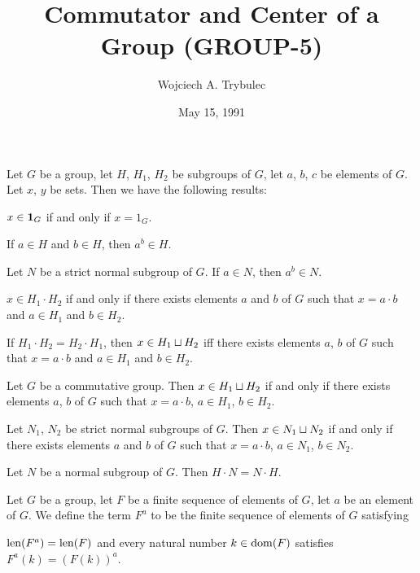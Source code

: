 \documentclass{article}
\title{Commutator and Center of a Group (GROUP-5)}
\author{Wojciech A. Trybulec}
\date{May 15, 1991}
\begin{document}
\maketitle

Let $G$ be a group, let $H$, $H_{1}$, $H_{2}$ be subgroups of $G$, let
$a$, $b$, $c$ be elements of $G$. Let $x$, $y$ be sets. Then we have the
following results:
\begin{thm}
\item\label{group5:1} $x\in\mathbf{1}_{G}$ if and only if $x=1_{G}$.
\item\label{group5:2} If $a\in H$ and $b\in H$, then $a^{b}\in H$.
\item\label{group5:3} Let $N$ be a strict normal subgroup of $G$.
  If $a\in N$, then $a^{b}\in N$.
\item\label{group5:4} $x\in H_{1}\cdot H_{2}$ if and only if there
  exists elements $a$ and $b$ of $G$ such that $x=a\cdot b$ and $a\in H_{1}$ and $b\in H_{2}$.
\item\label{group5:5} If $H_{1}\cdot H_{2}=H_{2}\cdot H_{1}$, then
  $x\in H_{1}\sqcup H_{2}$ iff there exists elements $a$, $b$ of $G$ such
  that $x=a\cdot b$ and $a\in H_{1}$ and $b\in H_{2}$.
\item\label{group5:6} Let $G$ be a commutative group.
  Then $x\in H_{1}\sqcup H_{2}$ if and only if there exists elements $a$,
  $b$ of $G$ such that $x=a\cdot b$, $a\in H_{1}$, $b\in H_{2}$.
\item\label{group5:7} Let $N_{1}$, $N_{2}$ be strict normal subgroups of $G$.
  Then $x\in N_{1}\sqcup N_{2}$ if and only if there exists elements $a$
  and $b$ of $G$ such that $x=a\cdot b$, $a\in N_{1}$, $b\in N_{2}$.
\item\label{group5:8} Let $N$ be a normal subgroup of $G$. Then $H\cdot N=N\cdot H$.
\end{thm}

\begin{definition}
Let $G$ be a group, let $F$ be a finite sequence of elements of $G$, let
$a$ be an element of $G$. We define the term $F^{a}$ to be the finite
sequence of elements of $G$ satisfying
\begin{defn}
\item $\operatorname{len}(F^{a})=\operatorname{len}(F)$ and every natural number $k\in\operatorname{dom}(F)$
  satisfies $F^{a}(k)=(F(k))^{a}$.
\end{defn}
\end{definition}
\end{document}
